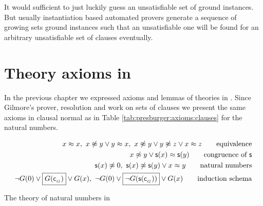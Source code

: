 It would sufficient to just luckily guess an unsatisfiable set of ground instances. 
But usually instantiation based automated provers generate a sequence of growing sets ground instances 
such that an unsatisfiable one will be found 
for an arbitrary unsatisfiable set of clauses
eventually.


%
%
%

%
%

\section{Theory axioms in \CNF}\label{sec:clausal:normal:form}

In the previous chapter we expressed axioms and lemmas of theories in \FOF. 
Since Gilmore's prover, resolution and \InstGen work on sets of clauses we present
the same axioms in clausal normal as in Table 
\ref{tab:presburger:axioms:clauses} for the natural numbers.

\begin{table}[hbt]	
	\begin{align*}
	x\mEQ x,\ 
	x\mNE y\lor y\mEQ x,\ 
	x\mNE y\lor y\mNE z\lor x\mEQ z
	\tag*{equivalence}
	\\
	x\mNE y\lor \msucc(x)\mEQ\msucc(y) 
	\tag*{congruence of $\msucc$}
	\\
	\msucc(x) \mNE 0,\ 
	\msucc(x) \mNE \msucc(y) \lor x \mEQ y
	\tag*{natural numbers}
	\\
	\lnot G(0) \lor \boxed{G(\mc_{_G})} \lor G(x),\ 
	\lnot G(0) \lor \boxed{\lnot G(\msucc(\mc_{_G}))} \lor G(x)
	\tag*{induction schema}
	\end{align*}
	\caption{The theory of natural numbers in \CNF}
	\label{tab:presburger:axioms:clauses}
\end{table}

